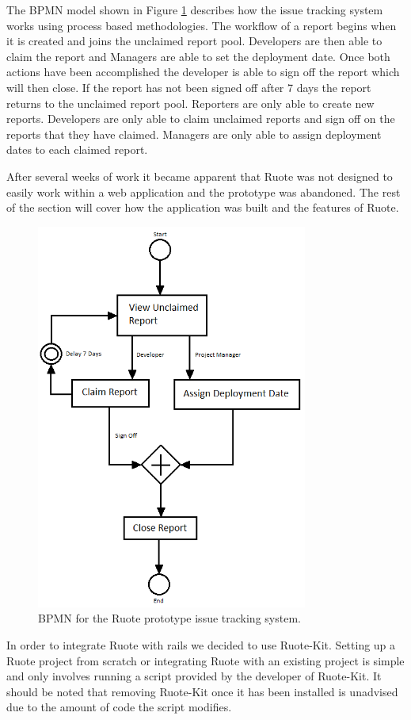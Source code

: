 \documentclass[document.tex]{subfiles}
\begin{document}
The BPMN model shown in Figure \ref{fig:ruote-bpmn-diagram} describes how the issue tracking system works using process based methodologies. The workflow of a report begins when it is created and joins the unclaimed report pool. Developers are then able to claim the report and Managers are able to set the deployment date. Once both actions have been accomplished the developer is able to sign off the report which will then close. If the report has not been signed off after 7 days the report returns to the unclaimed report pool. Reporters are only able to create new reports. Developers are only able to claim unclaimed reports and sign off on the reports that they have claimed. Managers are only able to assign deployment dates to each claimed report.

After several weeks of work it became apparent that Ruote was not designed to easily work within a web application and the prototype was abandoned. The rest of the section will cover how the application was built and the features of Ruote.

\begin{figure}[!ht]
\centering \includegraphics[height=5in]{./img/prototypes/ruote-bpmn-diagram}
\caption{BPMN for the Ruote prototype issue tracking system.}
\label{fig:ruote-bpmn-diagram}
\end{figure}

In order to integrate Ruote with rails we decided to use Ruote-Kit. Setting up a Ruote project from scratch or integrating Ruote with an existing project is simple and only involves running a script provided by the developer of Ruote-Kit. It should be noted that removing Ruote-Kit once it has been installed is unadvised due to the amount of code the script modifies.
\end{document}
